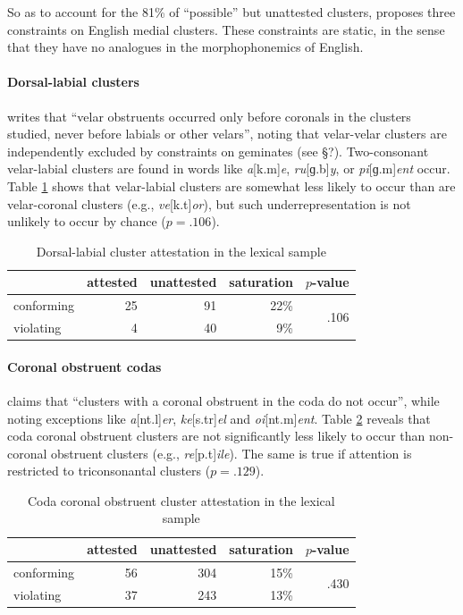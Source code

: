 So as to account for the 81\% of ``possible'' but unattested clusters, \citet{Pierrehumbert1994} proposes three constraints on English medial clusters. These constraints are static, in the sense that they have no analogues in the morphophonemics of English.

\paragraph{Dorsal-labial clusters} 
\citet[173]{Pierrehumbert1994} writes that ``velar obstruents occurred only before coronals in the clusters studied, never before labials or other velars'', noting that velar-velar clusters are independently excluded by constraints on geminates (see \S?). 
Two-consonant velar-labial clusters are found in words like \emph{a}[k.m]\emph{e}, \emph{ru}[ɡ.b]\emph{y}, or \emph{pi}[ɡ.m]\emph{ent} occur. 
Table \ref{dltab} shows that velar-labial clusters are somewhat less likely to occur than  are velar-coronal clusters (e.g., \emph{ve}[k.t]\emph{or}), but such underrepresentation is not unlikely to occur by chance ($p = .106$).

\begin{table}
\centering
\begin{tabular}{l rrrr}
\toprule
           & attested & unattested & saturation & $p$-value \\
\midrule
conforming & 25       & 91         & 22\%       & \multirow{2}{*}{.106} \\
violating  &  4       & 40         &  9\%       \\
\bottomrule
\end{tabular}
\caption{Dorsal-labial cluster attestation in the lexical sample}
\label{dltab}
\end{table}

\paragraph{Coronal obstruent codas} 
\citet[175]{Pierrehumbert1994} claims that ``clusters with a coronal obstruent in the coda do not occur'', while noting exceptions like \emph{a}[nt.l]\emph{er}, \emph{ke}[s.tr]\emph{el} and \emph{oi}[nt.m]\emph{ent}. 
Table \ref{cctab} reveals that coda coronal obstruent clusters are not significantly less likely to occur than non-coronal obstruent clusters (e.g., \emph{re}[p.t]\emph{ile}). 
The same is true if attention is restricted to triconsonantal clusters ($p = .129$).

\begin{table}
\centering
\begin{tabular}{l rrrr}
\toprule
           & attested & unattested & saturation & $p$-value \\
\midrule
conforming & 56       & 304        & 15\%       & \multirow{2}{*}{.430} \\
violating  & 37       & 243        & 13\%       \\
\bottomrule
\end{tabular}
\caption{Coda coronal obstruent cluster attestation in the lexical sample}
\label{cctab}
\end{table}

